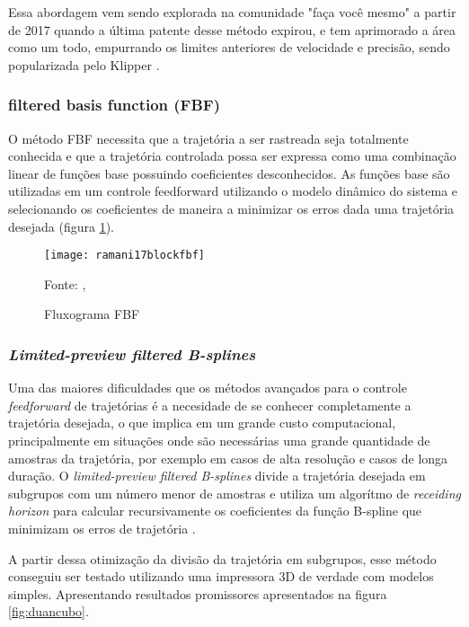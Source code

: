 Essa abordagem vem sendo explorada na comunidade "faça você mesmo" a partir de 2017 
quando a última patente desse método expirou, e tem aprimorado a área como
um todo, empurrando os limites anteriores de velocidade e precisão,
sendo popularizada pelo Klipper \cite{klipperkinematic}.

\subsubsection{filtered basis function (FBF)}
O método FBF necessita que a trajetória a ser rastreada seja totalmente
conhecida e que a trajetória controlada possa ser expressa como
uma combinação linear de funções base possuindo coeficientes desconhecidos.
As funções base são utilizadas em um controle feedforward utilizando
o modelo dinâmico do sistema e selecionando os coeficientes de maneira a
minimizar os erros dada uma trajetória desejada (figura \ref{fig:flowchart_fbf}).
\cite{ramani17}

\begin{figure}[!htb]
    \centering
    \caption{Fluxograma FBF}
    \texttt{[image: ramani17blockfbf]}

    {\footnotesize Fonte: \citeauthor{ramani17}, \citeyear{ramani17}}
    \label{fig:flowchart_fbf}
\end{figure}

\subsubsection{\textit{Limited-preview filtered B-splines}}
Uma das maiores dificuldades que os métodos avançados para o
controle \textit{feedforward} de trajetórias é a necesidade de se conhecer
completamente a trajetória desejada, o que implica em um grande custo
computacional, principalmente em situações onde são necessárias uma
grande quantidade de amostras da trajetória, por exemplo em casos de alta resolução
e casos de longa duração.
O \textit{limited-preview filtered B-splines} divide a trajetória desejada em subgrupos
com um número menor de amostras e utiliza um algorítmo de \textit{receiding horizon} para
calcular recursivamente os coeficientes da função B-spline que minimizam os erros
de trajetória \cite{duan18}.

A partir dessa otimização da divisão da trajetória em subgrupos, esse método
conseguiu ser testado utilizando uma impressora 3D de verdade com modelos simples.
Apresentando resultados promissores apresentados na figura \ref{fig:duancubo}.


